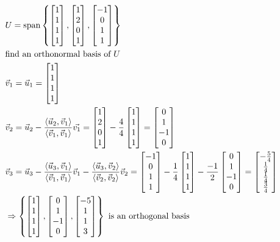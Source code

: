 \documentclass[11pt, fleqn]{article}
\begin{document}
\begin{align*}
    &U=\spann\brcurly{\matrixx{1\\1\\1\\1},\matrixx{1\\2\\0\\1},\matrixx{-1\\0\\1\\1}}\\
    &\text{find an orthonormal basis of $U$}\\
    &\vec{v}_1=\vec{u}_1=\matrixx{1\\1\\1\\1}\\
    &\vec{v}_2=\vec{u}_2-\frac{\brangle{\vec{u}_2,\vec{v}_1}}{\brangle{\vec{v}_1,\vec{v}_1}}\vec{v_1}=\matrixx{1\\2\\0\\1}-\frac{4}{4}\matrixx{1\\1\\1\\1}=\matrixx{0\\1\\-1\\0}\\
    &\vec{v}_3=\vec{u}_3-\frac{\brangle{\vec{u}_3,\vec{v}_1}}{\brangle{\vec{v}_1,\vec{v}_1}}\vec{v}_1-\frac{\brangle{\vec{u}_3,\vec{v}_2}}{\brangle{\vec{v}_2,\vec{v}_2}}\vec{v}_2=\matrixx{-1\\0\\1\\1}-\frac{1}{4}\matrixx{1\\1\\1\\1}-\frac{-1}{2}\matrixx{0\\1\\-1\\0}=\matrixx{-\frac{5}{4}\\\frac{1}{4}\\\frac{1}{4}\\\frac{3}{4}}\\
    &\Ra \brcurly{\matrixx{1\\1\\1\\1},\matrixx{0\\1\\-1\\0},\matrixx{-5\\1\\1\\3}}\text{ is an orthogonal basis}\\

\end{align*}
\end{document}
